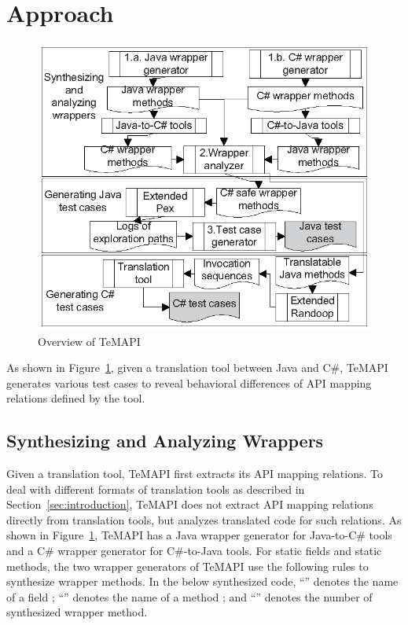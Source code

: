 \section{Approach}
\label{sec:approach}
\begin{figure}[t]
\centering
\includegraphics[scale=0.9,clip]{figure/approach.eps}\vspace*{-3ex}
 \caption{Overview of TeMAPI}\vspace*{-4ex}
 \label{fig:approach}
\end{figure}

As shown in Figure~\ref{fig:approach}, given a translation tool between Java and C\#, TeMAPI generates various test cases to reveal behavioral differences of API mapping relations defined by the tool.


\subsection{Synthesizing and Analyzing Wrappers}
\label{sec:approach:wrapper}

Given a translation tool, TeMAPI first extracts its API mapping relations. To deal with different formats of translation tools as described in Section~\ref{sec:introduction}, TeMAPI does not extract API mapping relations directly from translation tools, but analyzes translated code for such relations. As shown in Figure~\ref{fig:approach}, TeMAPI has a Java wrapper generator for Java-to-C\# tools and a C\# wrapper generator for C\#-to-Java tools. For static fields and static methods, the two wrapper generators of TeMAPI use the following rules to synthesize wrapper methods. In the below synthesized code, ``'' denotes the name of a field ; ``'' denotes the name of a method ; and ``'' denotes the number of synthesized wrapper method.

